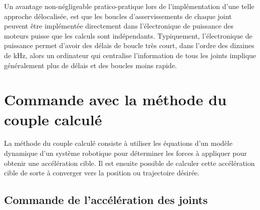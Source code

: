Un avantage non-négligeable pratico-pratique lors de l'implémentation d'une telle approche délocalisée, est que les boucles d'asservissements de chaque joint peuvent être implémentée directement dans l'électronique de puissance des moteurs puisse que les calculs sont indépendants. Typiquement, l'électronique de puissance permet d'avoir des délais de boucle très court, dans l'ordre des dizaines de kHz, alors un ordinateur qui centralise l'information de tous les joints implique généralement plus de délais et des boucles moins rapide. 


\newpage
\section{Commande avec la méthode du couple calculé}

La méthode du couple calculé consiste à utiliser les équations d'un modèle dynamique d'un système robotique pour déterminer les forces à appliquer pour obtenir une accélération cible. Il est ensuite possible de calculer cette accélération cible de sorte à converger vers la position ou trajectoire désirée.





\subsection{Commande de l'accélération des joints}


